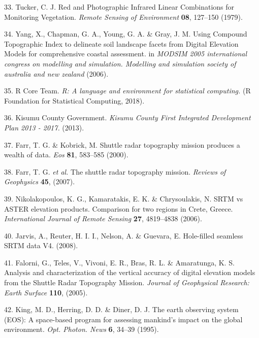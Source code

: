 \documentclass[12pt,oneside]{article}
\begin{document}
\leavevmode\hypertarget{ref-Tucker_1979}{}%
33. Tucker, C. J. Red and Photographic Infrared Linear Combinations for Monitoring Vegetation. \emph{Remote Sensing of Environment} \textbf{08}, 127--150 (1979).

\leavevmode\hypertarget{ref-Yang_et_al_2006}{}%
34. Yang, X., Chapman, G. A., Young, G. A. \& Gray, J. M. Using Compound Topographic Index to delineate soil landscape facets from Digital Elevation Models for comprehensive coastal assessment. in \emph{MODSIM 2005 international congress on modelling and simulation. Modelling and simulation society of australia and new zealand} (2006).

\leavevmode\hypertarget{ref-RCoreTeam_2018}{}%
35. R Core Team. \emph{R: A language and environment for statistical computing.} (R Foundation for Statistical Computing, 2018).

\leavevmode\hypertarget{ref-KisumuCountyGovernment_2013}{}%
36. Kisumu County Government. \emph{Kisumu County First Integrated Development Plan 2013 - 2017.} (2013).

\leavevmode\hypertarget{ref-Farr_et_al_2000}{}%
37. Farr, T. G. \& Kobrick, M. Shuttle radar topography mission produces a wealth of data. \emph{Eos} \textbf{81}, 583--585 (2000).

\leavevmode\hypertarget{ref-Farr_et_al_2007}{}%
38. Farr, T. G. \emph{et al.} The shuttle radar topography mission. \emph{Reviews of Geophysics} \textbf{45}, (2007).

\leavevmode\hypertarget{ref-Nikolakopoulos_et_al_2006}{}%
39. Nikolakopoulos, K. G., Kamaratakis, E. K. \& Chrysoulakis, N. SRTM vs ASTER elevation products. Comparison for two regions in Crete, Greece. \emph{International Journal of Remote Sensing} \textbf{27}, 4819--4838 (2006).

\leavevmode\hypertarget{ref-Jarvis_et_al_2008}{}%
40. Jarvis, A., Reuter, H. I. I., Nelson, A. \& Guevara, E. Hole-filled seamless SRTM data V4. (2008).

\leavevmode\hypertarget{ref-Falorni_et_al_2005}{}%
41. Falorni, G., Teles, V., Vivoni, E. R., Bras, R. L. \& Amaratunga, K. S. Analysis and characterization of the vertical accuracy of digital elevation models from the Shuttle Radar Topography Mission. \emph{Journal of Geophysical Research: Earth Surface} \textbf{110}, (2005).

\leavevmode\hypertarget{ref-King_et_al_1995}{}%
42. King, M. D., Herring, D. D. \& Diner, D. J. The earth observing system (EOS): A space-based program for assessing mankind's impact on the global environment. \emph{Opt. Photon. News} \textbf{6}, 34--39 (1995).
\end{document}

